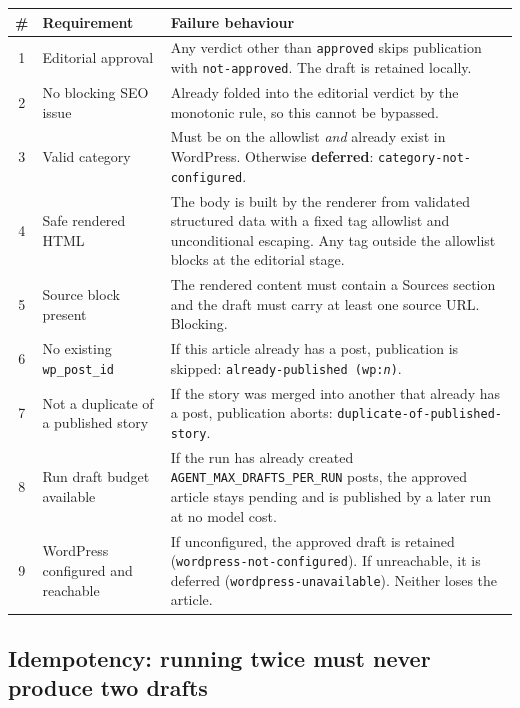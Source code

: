 \documentclass[11pt,a4paper]{article}
\newcommand{\var}[1]{\texttt{\small\hyphenpenalty=0\exhyphenpenalty=0\relax #1}}
\newcommand{\us}{\_\discretionary{}{}{}}
\newcommand{\brk}{\hyphenpenalty=0\exhyphenpenalty=0\relax}
\newcommand{\code}[1]{\texttt{\small\brk #1}}
\begin{document}
\begin{center}
\small
\begin{tabularx}{\textwidth}{@{}c p{4.0cm} >{\RaggedRight}X@{}}
\toprule
\textbf{\#} & \textbf{Requirement} & \textbf{Failure behaviour} \\
\midrule
1 & Editorial approval & Any verdict other than \code{approved} skips publication
  with \code{not-approved}. The draft is retained locally. \\
2 & No blocking SEO issue & Already folded into the editorial verdict by the
  monotonic rule, so this cannot be bypassed. \\
3 & Valid category & Must be on the allowlist \emph{and} already exist in
  WordPress. Otherwise \textbf{deferred}: \code{category-not-configured}. \\
4 & Safe rendered HTML & The body is built by the renderer from validated
  structured data with a fixed tag allowlist and unconditional escaping. Any tag
  outside the allowlist blocks at the editorial stage. \\
5 & Source block present & The rendered content must contain a Sources section and
  the draft must carry at least one source URL. Blocking. \\
6 & No existing \code{wp\_post\_id} & If this article already has a post,
  publication is skipped: \code{already-published (wp:\textit{n})}. \\
7 & Not a duplicate of a published story & If the story was merged into another
  that already has a post, publication aborts:
  \code{duplicate-of-published-story}. \\
8 & Run draft budget available & If the run has already created
  \var{AGENT\us MAX\us DRAFTS\us PER\us RUN} posts, the approved article stays
  pending and is published by a later run at no model cost. \\
9 & WordPress configured and reachable & If unconfigured, the approved draft is
  retained (\code{wordpress-}\allowbreak\code{not-configured}). If unreachable, it is deferred
  (\code{wordpress-unavailable}). Neither loses the article. \\
\bottomrule
\end{tabularx}
\end{center}

\subsection{Idempotency: running twice must never produce two drafts}
\end{document}
